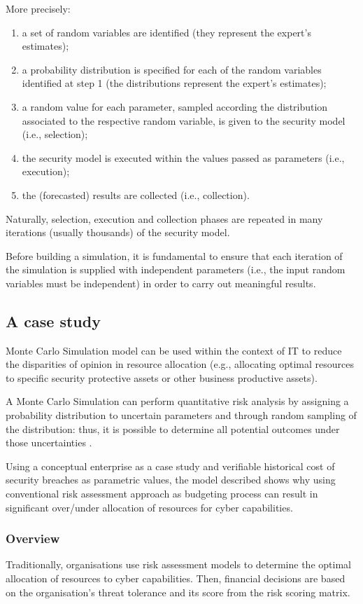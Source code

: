 More precisely:
\begin{enumerate}
    \item a set of random variables are identified (they represent the expert's estimates);
    \item a probability distribution is specified for each of the random variables identified at step 1 (the distributions represent the expert's estimates);
    \item a random value for each parameter, sampled according the distribution associated to the respective random variable, is given to the security model (i.e., selection);
    \item the security model is executed within the values passed as parameters (i.e., execution);
    \item the (forecasted) results are collected (i.e., collection).
\end{enumerate}

Naturally, selection, execution and collection phases are repeated in many iterations (usually thousands) of the security model.

Before building a simulation, it is fundamental to ensure that each iteration of the simulation is supplied with independent parameters (i.e., the input random variables must be independent) in order to carry out meaningful results.


\subsection{A case study}
Monte Carlo Simulation model can be used within the context of IT to reduce the disparities of opinion in resource allocation (e.g., allocating optimal resources to specific security protective assets or other business productive assets).

A Monte Carlo Simulation can perform quantitative risk analysis by assigning a probability distribution to uncertain parameters and through random sampling of the distribution: thus, it is possible to determine all potential outcomes under those uncertainties \parencite{Vose}.

Using a conceptual enterprise as a case study and verifiable historical cost of security breaches as parametric values, the model described shows why using conventional risk assessment approach as budgeting process can result in significant over/under allocation of resources for cyber capabilities.

\subsubsection{Overview}
Traditionally, organisations use risk assessment models to determine the optimal allocation of resources to cyber capabilities.
Then, financial decisions are based on the organisation's threat tolerance and its score from the risk scoring matrix.

